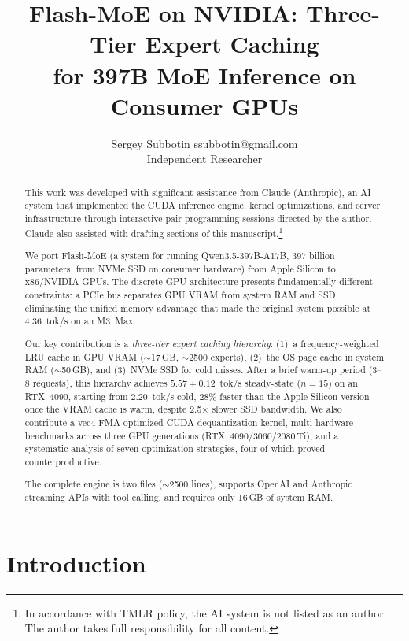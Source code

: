 \documentclass[10pt]{article}
\title{Flash-MoE on NVIDIA: Three-Tier Expert Caching\\for 397B MoE Inference on Consumer GPUs}
\author{\name Sergey Subbotin \email ssubbotin@gmail.com \\
      \addr Independent Researcher}
\begin{document}
\maketitle

\begin{abstract}
This work was developed with significant assistance from Claude (Anthropic), an AI system that implemented the CUDA inference engine, kernel optimizations, and server infrastructure through interactive pair-programming sessions directed by the author. Claude also assisted with drafting sections of this manuscript.\footnote{In accordance with TMLR policy, the AI system is not listed as an author. The author takes full responsibility for all content.}

We port Flash-MoE (a system for running Qwen3.5-397B-A17B, 397 billion parameters, from NVMe SSD on consumer hardware) from Apple Silicon to x86/NVIDIA GPUs. The discrete GPU architecture presents fundamentally different constraints: a PCIe bus separates GPU VRAM from system RAM and SSD, eliminating the unified memory advantage that made the original system possible at 4.36~tok/s on an M3~Max.

Our key contribution is a \emph{three-tier expert caching hierarchy}: (1)~a frequency-weighted LRU cache in GPU VRAM ($\sim$17\,GB, $\sim$2500 experts), (2)~the OS page cache in system RAM ($\sim$50\,GB), and (3)~NVMe SSD for cold misses. After a brief warm-up period (3--8 requests), this hierarchy achieves $5.57 \pm 0.12$~tok/s steady-state ($n=15$) on an RTX~4090, starting from 2.20~tok/s cold, 28\% faster than the Apple Silicon version once the VRAM cache is warm, despite 2.5$\times$ slower SSD bandwidth. We also contribute a vec4 FMA-optimized CUDA dequantization kernel, multi-hardware benchmarks across three GPU generations (RTX~4090/3060/2080\,Ti), and a systematic analysis of seven optimization strategies, four of which proved counterproductive.

The complete engine is two files ($\sim$2500 lines), supports OpenAI and Anthropic streaming APIs with tool calling, and requires only 16\,GB of system RAM.
\end{abstract}

\section{Introduction}
\end{document}
